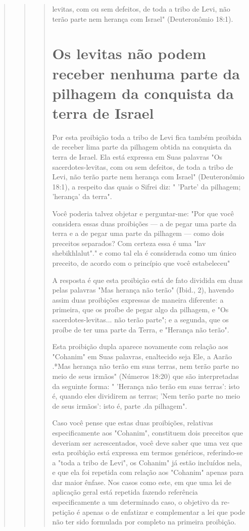 \begin{quote}
\begin{quote}
\begin{quote}levitas, com ou sem defeitos, de toda a tribo de Levi, não terão parte
nem he­rança com Israel" (Deuteronômio 18:1).

\section{Os levitas não podem receber nenhuma parte da pilhagem da conquista
da terra de Israel}

Por esta proibição toda a tribo de Levi fica também proibida de re­ceber
lima parte da pilhagem obtida na conquista da terra de Israel. Ela está
expressa em Suas palavras "Os sacerdotes-levitas, com ou sem defeitos,
de to­da a tribo de Levi, não terão parte nem herança com Israel"
(Deuteronômio 18:1), a respeito das quais o Sifrei diz: " 'Parte' da
pilhagem; 'herança' da terra".

Você poderia talvez objetar e perguntar-me: "Por que você conside­ra
essas duas proibições --- a de pegar uma parte da terra e a de pegar uma
parte da pilhagem --- como dois preceitos separados? Com certeza essa é
uma "lav shebikhlalut"." e como tal ela é considerada
como um único preceito, de acordo com o princípio que você estabeleceu"

A resposta é que esta proibição está de fato dividida em duas pelas
palavras "Mas herança não terão" (Ibid., 2), havendo assim duas
proibições ex­pressas de maneira diferente: a primeira, que os proíbe de
pegar algo da pilha­gem, e "Os sacerdotes-levitas... não terão parte"; e
a segunda, que os proíbe de ter uma parte da Terra, e "Herança não
terão".

Esta proibição dupla aparece novamente com relação aos "Cohanim" em Suas
palavras, enaltecido seja Ele, a Aarão .*Mas herança
não terão em suas terras, nem terão parte no meio de seus irmãos"
(Números 18:20) que são in­terpretadas da seguinte forma: " 'Herança não
terão em suas terras': isto é, quan­do eles dividirem as terras; 'Nem
terão parte no meio de seus irmãos': isto é, parte .da pilhagem".

Caso você pense que estas duas proibições, relativas especificamen­te
aos "Cohanim", constituem dois preceitos que deveriam ser acrescentados,
você deve saber que uma vez que esta proibição está expressa em termos
gené­ricos, referindo-se a "toda a tribo de Levi", os Cohanim" já estão
incluídos nela, e que ela foi repetida com relação aos "Cohanim" apenas
para dar maior ênfase. Nos casos como este, em que uma lei de aplicação
geral está repetida fazendo referência especificamente a um determinado
caso, o objetivo da re­petição é apenas o de enfatizar e complementar a
lei que pode não ter sido for­mulada por completo na primeira proibição.


\end{quote}
\end{quote}
\end{quote}
